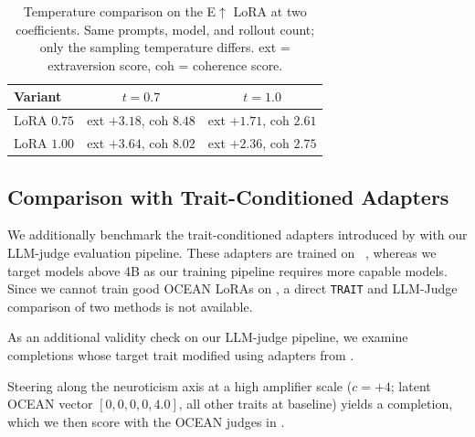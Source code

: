\begin{table}[htbp]
\centering
\begin{tabular}{lcc}
\toprule
Variant & $t = 0.7$ & $t = 1.0$ \\
\midrule
LoRA $0.75$ & ext $+3.18$, coh $8.48$ & ext $+1.71$, coh $2.61$ \\
LoRA $1.00$ & ext $+3.64$, coh $8.02$ & ext $+2.36$, coh $2.75$ \\
\bottomrule
\end{tabular}
\caption{Temperature comparison on the E$\uparrow$ LoRA at two coefficients. Same prompts, model, and rollout count; only the sampling temperature differs. ext = extraversion score, coh = coherence score.}
\label{tab:induction-temperature}
\end{table}

\subsection{Comparison with Trait-Conditioned Adapters}\label{sec:appendix-prefix}

We additionally benchmark the trait-conditioned adapters introduced by \citet{vu2026psychadapter} with our LLM-judge evaluation pipeline. These adapters are trained on \GemmaSizeTwoBIT~\citep{gemma2b-it}, whereas we target models above 4B as our training pipeline requires more capable models. Since we cannot train good OCEAN LoRAs on \GemmaSizeTwoBIT, a direct \texttt{TRAIT} and LLM-Judge comparison of two methods is not available.

As an additional validity check on our LLM-judge pipeline, we examine completions whose target trait modified using adapters from \citet{vu2026psychadapter}.

Steering along the neuroticism axis at a high amplifier scale ($c=+4$; latent OCEAN vector $[0,0,0,0,4.0]$, all other traits at baseline) yields a completion, which we then score with the OCEAN judges in .

